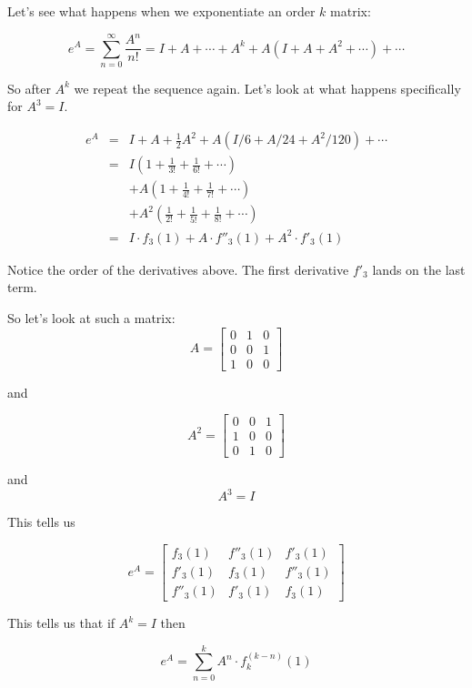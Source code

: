 \documentclass{amsart}
\theoremstyle{definition}
\theoremstyle{remark}
\numberwithin{equation}{section}
\begin{document}
Let's see what happens when we exponentiate an order $k$ matrix:

\begin{equation}
e^A = \sum_{n=0}^{\infty} \frac{A^n}{n!} = I + A + \cdots + A^k + A(I+A+A^2 + \cdots ) + \cdots
\end{equation}

So after $A^k$ we repeat the sequence again.  Let's look at what happens specifically for $A^3=I$.

\begin{eqnarray}
e^A & = & I + A + \frac{1}{2}A^2 + A(I/6+A/24+A^2/120) + \cdots \nonumber\\
& = & I(1 + \frac{1}{3!}+ \frac{1}{6!}+\cdots)\nonumber\\
&   & + A (1+ \frac{1}{4!}+ \frac{1}{7!}+\cdots)\nonumber\\
&   & + A^2 (\frac{1}{2!}+ \frac{1}{5!}+ \frac{1}{8!}+\cdots)\nonumber\\
& = & I\cdot f_3(1) + A \cdot f''_3(1) + A^2 \cdot f'_3(1)
\end{eqnarray}


Notice the order of the derivatives above.  The first derivative $f'_3$ lands on the last term.

So let's look at such a matrix:
\[
A = \begin{bmatrix}
0 & 1 & 0\\
0 & 0 & 1\\
1 & 0 & 0
\end{bmatrix}
\]

and 

\[
A^2 = \begin{bmatrix}
0 & 0 & 1\\
1 & 0 & 0\\
0 & 1 & 0
\end{bmatrix}
\]

and  
\[ A^3 = I
\]


This tells us

\[
e^A = \begin{bmatrix}
f_3(1) & f''_3(1) & f'_3(1)\\
f'_3(1) & f_3(1) & f''_3(1)\\
f''_3(1) & f'_3(1) & f_3(1)
\end{bmatrix}
\]



This tells us that if $A^k = I$ then

\[
e^A = \sum_{n=0}^{k} A^n \cdot f^{(k-n)}_k(1)
\]
\end{document}
